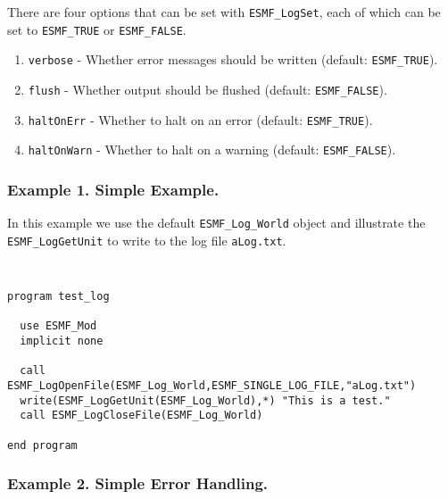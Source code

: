 %


There are four options that can be set with {\tt ESMF\_LogSet}, each of which 
can be set to {\tt ESMF\_TRUE} or {\tt ESMF\_FALSE}.
\begin{enumerate}
\item {\tt verbose} - Whether error messages should be written (default: {\tt ESMF\_TRUE}).
\item {\tt flush} - Whether output should be flushed (default:  {\tt ESMF\_FALSE}).
\item {\tt haltOnErr} - Whether to halt on an error (default:  {\tt ESMF\_TRUE}).
\item {\tt haltOnWarn} - Whether to halt on a warning (default:  {\tt ESMF\_FALSE}).
\end {enumerate}

\subsubsection{Example 1. Simple Example.}

In this example we use the default {\tt ESMF\_Log\_World} object and 
illustrate the {\tt ESMF\_LogGetUnit} to write to the log file 
{\tt aLog.txt}.

{\tt
\begin{verbatim}
program test_log

  use ESMF_Mod
  implicit none

  call ESMF_LogOpenFile(ESMF_Log_World,ESMF_SINGLE_LOG_FILE,"aLog.txt")
  write(ESMF_LogGetUnit(ESMF_Log_World),*) "This is a test."
  call ESMF_LogCloseFile(ESMF_Log_World)

end program
\end{verbatim}
\tt}

\subsubsection{Example 2. Simple Error Handling.}

